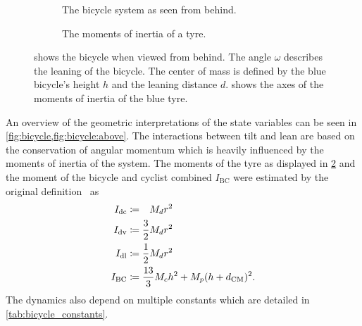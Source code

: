 \begin{figure}[p]
    \centering
    \begin{subfigure}[b]{\subfigurewidth}
        \centering
        
        \caption{
            The bicycle system as seen from behind.
        }
        \label{fig:bicycle:behind}
    \end{subfigure}
    \begin{subfigure}[b]{\subfigurewidth}
        \centering
        
        \caption{
            The moments of inertia of a tyre.
        }
        \label{fig:bicycle:inertia}
    \end{subfigure}
    \caption{
         shows the bicycle when viewed from behind.
        The angle $\omega$ describes the leaning of the bicycle.
        The center of mass is defined by the blue bicycle's height $h$ and the leaning distance $d$.
         shows the axes of the moments of inertia of the blue tyre.
    }
    \label{fig:bicycle}
\end{figure}

An overview of the geometric interpretations of the state variables can be seen in \cref{fig:bicycle,fig:bicycle:above}.
The interactions between tilt and lean are based on the conservation of angular momentum which is heavily influenced by the moments of inertia of the system.
The moments of the tyre as displayed in \cref{fig:bicycle:inertia} and the moment of the bicycle and cyclist combined $I_{\text{BC}}$ were estimated by the original definition~\cite{randlov_learning_1998} as
\begin{align}
    I_{\text{dc}} &\coloneqq \hphantom{\frac{1}{2}}M_d r^2\\
    I_{\text{dv}} &\coloneqq \frac{3}{2}M_d r^2\\
    I_{\text{dl}} &\coloneqq \frac{1}{2}M_d r^2\\
    I_{\text{BC}} &\coloneqq \frac{13}{3} M_c h^2 + M_p(h + d_\CM)^2.
\end{align}
The dynamics also depend on multiple constants which are detailed in \cref{tab:bicycle_constants}.

